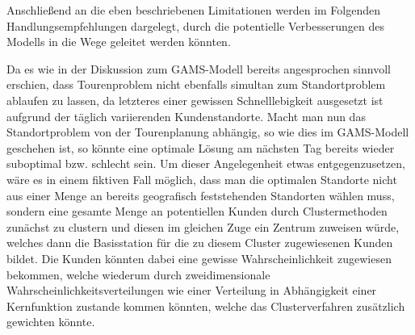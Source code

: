 \documentclass[a4paper,12pt,parskip,bibtotoc,liststotoc]{article}
\begin{document}
Anschließend an die eben beschriebenen Limitationen werden im Folgenden Handlungsempfehlungen dargelegt, durch die potentielle Verbesserungen des Modells in die Wege geleitet werden könnten.

Da es wie in der Diskussion zum GAMS-Modell bereits angesprochen sinnvoll erschien, dass Tourenproblem nicht ebenfalls simultan zum Standortproblem ablaufen zu lassen, da letzteres einer gewissen Schnelllebigkeit ausgesetzt ist aufgrund der täglich variierenden Kundenstandorte.
Macht man nun das Standortproblem von der Tourenplanung abhängig, so wie dies im GAMS-Modell geschehen ist, so könnte eine optimale Lösung am nächsten Tag bereits wieder suboptimal bzw. schlecht sein.
Um dieser Angelegenheit etwas entgegenzusetzen, wäre es in einem fiktiven Fall möglich, dass man die optimalen Standorte nicht aus einer Menge an bereits geografisch feststehenden Standorten wählen muss, sondern eine gesamte Menge an potentiellen Kunden durch Clustermethoden zunächst zu clustern und diesen im gleichen Zuge ein Zentrum zuweisen würde, welches dann die Basisstation für die zu diesem Cluster zugewiesenen Kunden bildet.
Die Kunden könnten dabei eine gewisse Wahrscheinlichkeit zugewiesen bekommen, welche wiederum durch zweidimensionale Wahrscheinlichkeitsverteilungen wie einer Verteilung in Abhängigkeit einer Kernfunktion zustande kommen könnten, welche das Clusterverfahren zusätzlich gewichten könnte.
\end{document}
